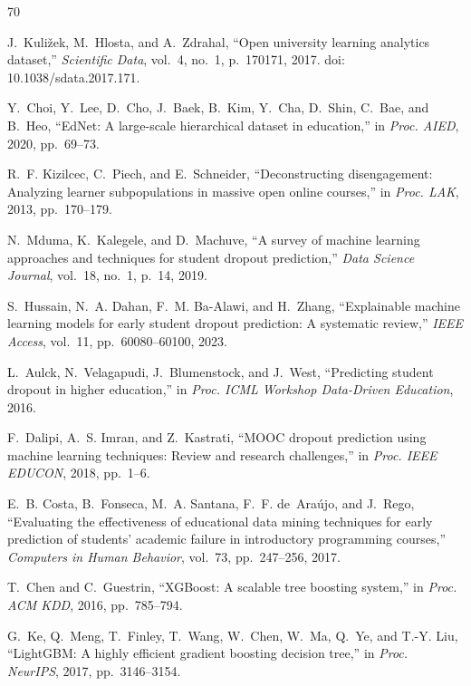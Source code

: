 \begin{thebibliography}{70}

J.~Kuli\v{z}ek, M.~Hlosta, and A.~Zdrahal,
``Open university learning analytics dataset,''
\textit{Scientific Data}, vol.~4, no.~1, p.~170171, 2017.
doi: 10.1038/sdata.2017.171.

Y.~Choi, Y.~Lee, D.~Cho, J.~Baek, B.~Kim, Y.~Cha, D.~Shin, C.~Bae, and B.~Heo,
``EdNet: A large-scale hierarchical dataset in education,''
in \textit{Proc. AIED}, 2020, pp.~69--73.

R.~F. Kizilcec, C.~Piech, and E.~Schneider,
``Deconstructing disengagement: Analyzing learner subpopulations in massive open online courses,''
in \textit{Proc. LAK}, 2013, pp.~170--179.

N.~Mduma, K.~Kalegele, and D.~Machuve,
``A survey of machine learning approaches and techniques for student dropout prediction,''
\textit{Data Science Journal}, vol.~18, no.~1, p.~14, 2019.

S.~Hussain, N.~A. Dahan, F.~M. Ba-Alawi, and H.~Zhang,
``Explainable machine learning models for early student dropout prediction: A systematic review,''
\textit{IEEE Access}, vol.~11, pp.~60080--60100, 2023.

L.~Aulck, N.~Velagapudi, J.~Blumenstock, and J.~West,
``Predicting student dropout in higher education,''
in \textit{Proc. ICML Workshop Data-Driven Education}, 2016.

F.~Dalipi, A.~S. Imran, and Z.~Kastrati,
``MOOC dropout prediction using machine learning techniques: Review and research challenges,''
in \textit{Proc. IEEE EDUCON}, 2018, pp.~1--6.

E.~B. Costa, B.~Fonseca, M.~A. Santana, F.~F. de~Ara{\'u}jo, and J.~Rego,
``Evaluating the effectiveness of educational data mining techniques for early prediction of students' academic failure in introductory programming courses,''
\textit{Computers in Human Behavior}, vol.~73, pp.~247--256, 2017.

T.~Chen and C.~Guestrin,
``XGBoost: A scalable tree boosting system,''
in \textit{Proc. ACM KDD}, 2016, pp.~785--794.

G.~Ke, Q.~Meng, T.~Finley, T.~Wang, W.~Chen, W.~Ma, Q.~Ye, and T.-Y. Liu,
``LightGBM: A highly efficient gradient boosting decision tree,''
in \textit{Proc. NeurIPS}, 2017, pp.~3146--3154.


\end{thebibliography}

